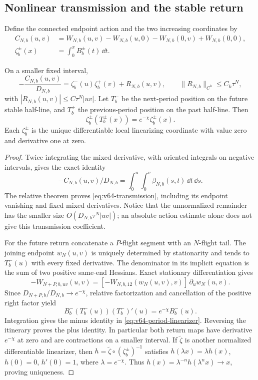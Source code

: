 \subsection{Nonlinear transmission and the stable return}

Define the connected endpoint action and the two increasing coordinates
by
\[
 \begin{split}
 C_{N,b}(u,v)&=W_{N,b}(u,v)-W_{N,b}(u,0)
                         -W_{N,b}(0,v)+W_{N,b}(0,0),\\
 \zeta_b^\pm(x)&=\int_0^x B_b^\pm(t)\,\dd t.
 \end{split}
\]

\begin{corollary}
\label{cor:v64-transmission}
On a smaller fixed interval,
\begin{equation}\label{eq:v64-transmission}
 -\frac{C_{N,b}(u,v)}{D_{N,b}}
       =\zeta_b^-(u)\zeta_b^+(v)+R_{N,b}(u,v),\qquad
 \|R_{N,b}\|_{C^k}\le C_k\tau^N,
\end{equation}
with $|R_{N,b}(u,v)|\le C\tau^N|uv|$.
Let $T_b^-$ be the next-period position on the future stable half-line,
and $T_b^+$ the previous-period position on the past half-line.  Then
\begin{equation}\label{eq:v64-period-linearizer}
 \zeta_b^\pm(T_b^\pm(x))=e^{-\chi}\zeta_b^\pm(x).
\end{equation}
Each $\zeta_b^\pm$ is the unique differentiable local linearizing
coordinate with value zero and derivative one at zero.
\end{corollary}
\begin{proof}
Twice integrating the mixed derivative, with oriented integrals on
negative intervals, gives the exact identity
\[
 -C_{N,b}(u,v)/D_{N,b}
             =\int_0^u\int_0^v\beta_{N,b}(s,t)\,\dd t\,\dd s.
\]
The relative theorem proves \eqref{eq:v64-transmission}, including
its endpoint vanishing and fixed mixed derivatives.  Notice that the
unnormalized remainder has the smaller size
$O(D_{N,b}\tau^N|uv|)$; an absolute action estimate alone does not
give this transmission coefficient.

For the future return concatenate a $P$-flight segment with an
$N$-flight tail.  The joining endpoint $w_N(u,v)$ is uniquely determined
by stationarity and tends to $T_b^-(u)$ with every fixed derivative.
The denominator in its implicit equation is the sum of two positive
same-end Hessians.  Exact stationary differentiation gives
\[
 -W_{N+P,b,uv}(u,v)
       =[-W_{N,b,12}(w_N(u,v),v)]\,\partial_u w_N(u,v).
\]
Since $D_{N+P,b}/D_{N,b}\to e^{-\chi}$, relative factorization
and cancellation of the positive right factor yield
\[
 B_b^-(T_b^-(u))(T_b^-)'(u)=e^{-\chi}B_b^-(u).
\]
Integration gives the minus identity in \eqref{eq:v64-period-linearizer}.
Reversing the itinerary proves the plus identity.  In particular both
return maps have derivative $e^{-\chi}$ at zero and are contractions
on a smaller interval.  If $\widetilde\zeta$ is another normalized
differentiable linearizer, then
$h=\widetilde\zeta\circ(\zeta_b^\pm)^{-1}$ satisfies
$h(\lambda x)=\lambda h(x)$, $h(0)=0$, $h'(0)=1$, where
$\lambda=e^{-\chi}$.  Thus
$h(x)=\lambda^{-n}h(\lambda^nx)\to x$, proving uniqueness.
\end{proof}

